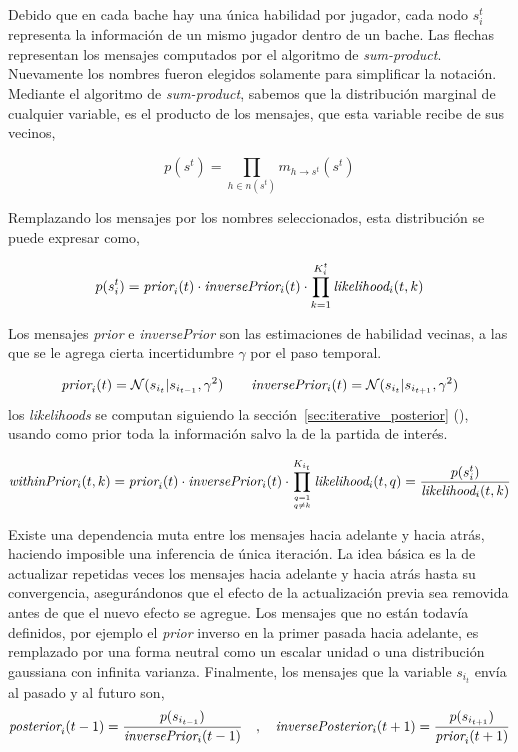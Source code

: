 \documentclass[11pt,twoside,spanish]{report} %
\newcommand\hfrac[2]{\genfrac{}{}{0pt}{}{#1}{#2}}
\newcommand{\N}{\mathcal{N}}
\begin{document}
Debido que en cada bache hay una \'unica habilidad por jugador, cada nodo $s_i^t$ representa la informaci\'on de un mismo jugador dentro de un bache.
Las flechas representan los mensajes computados por el algoritmo de \textit{sum-product}.
Nuevamente los nombres fueron elegidos solamente para simplificar la notaci\'on.
Mediante el algoritmo de \textit{sum-product}, sabemos que la distribuci\'on marginal de cualquier variable, es el producto de los mensajes, que esta variable recibe de sus vecinos,

\begin{equation}
p(s^t) = \prod_{h \in n(s^t)} m_{h \rightarrow s^t}(s^t)
\end{equation}

Remplazando los mensajes por los nombres seleccionados, esta distribuci\'on se puede expresar como,

\begin{equation}
p(s_i^t) = \emph{prior}_i(t) \cdot \emph{inversePrior}_i(t) \cdot \prod_{k=1}^{K_i^t} \emph{likelihood}_i(t,k)
\end{equation}


Los mensajes \emph{prior} e \emph{inversePrior} son las estimaciones de habilidad vecinas, a las que se le agrega cierta incertidumbre $\gamma$ por el paso temporal.


\begin{equation*}
\emph{prior}_i(t) = \N(s_{i_t}|s_{i_{t-1}}, \gamma^2) \ \ \ \ \ \ \emph{inversePrior}_i(t) = \N(s_{i_t}|s_{i_{t+1}}, \gamma^2)
\end{equation*}
%
los \textit{likelihoods} se computan siguiendo la secci\'on~\ref{sec:iterative_posterior} (), usando como prior toda la informaci\'on salvo la de la partida de inter\'es.

 \begin{equation}
 \emph{withinPrior}_i(t,k) = \emph{prior}_i(t) \cdot \emph{inversePrior}_i(t) \cdot \prod_{\hfrac{q=1}{q\neq k}}^{K_{i_t}} \emph{likelihood}_i(t,q) = \frac{p(s_i^t) }{\emph{likelihood}_i(t,k)}
 \end{equation}
 
Existe una dependencia muta entre los mensajes hacia adelante y hacia atr\'as, haciendo imposible una inferencia de \'unica iteraci\'on.
La idea b\'asica es la de actualizar repetidas veces los mensajes hacia adelante y hacia atr\'as hasta su convergencia, asegur\'andonos que el efecto de la actualizaci\'on previa sea removida antes de que el nuevo efecto se agregue.
Los mensajes que no est\'an todav\'ia definidos, por ejemplo el \textit{prior} inverso en la primer pasada hacia adelante, es remplazado por una forma neutral como un escalar unidad o una distribuci\'on gaussiana con infinita varianza.
Finalmente, los mensajes que la variable $s_{i_t}$ env\'ia al pasado y al futuro son,
%
\begin{equation*}
  \emph{posterior}_i(t-1) = \frac{p(s_{i_{t-1}})}{\emph{inversePrior}_i(t-1)} \ \ \ , \ \ \ \emph{inversePosterior}_i(t+1) = \frac{p(s_{i_{t+1}})}{\emph{prior}_i(t+1)}
\end{equation*}
\end{document}
